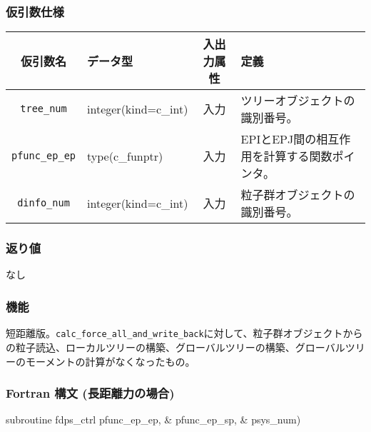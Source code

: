 \subsubsection*{仮引数仕様}
\begin{table}[h]
\begin{tabularx}{\linewidth}{cXcX}
\toprule
\rowcolor{Snow2}
仮引数名 & データ型 & 入出力属性 & 定義 \\
\midrule
\verb|tree_num|    & integer(kind=c\_int)   & 入力     & ツリーオブジェクトの識別番号。\\
\verb|pfunc_ep_ep| & type(c\_funptr)        & 入力     & EPIとEPJ間の相互作用を計算する関数ポインタ。\\
\verb|dinfo_num|   & integer(kind=c\_int)   & 入力     & 粒子群オブジェクトの識別番号。\\
\bottomrule
\end{tabularx}
\end{table}

\subsubsection*{返り値}
なし

\subsubsection*{機能}
短距離版。\texttt{calc\_force\_all\_and\_write\_back}に対して、粒子群オブジェクトからの粒子読込、ローカルツリーの構築、グローバルツリーの構築、グローバルツリーのモーメントの計算がなくなったもの。
\clearpage

\subsubsection*{Fortran 構文 (長距離力の場合)}
\begin{screen}
\begin{spverbatim}
subroutine fdps_ctrl%
                                               pfunc_ep_ep, &
                                               pfunc_ep_sp, &
                                               psys_num)
\end{spverbatim}
\end{screen}


